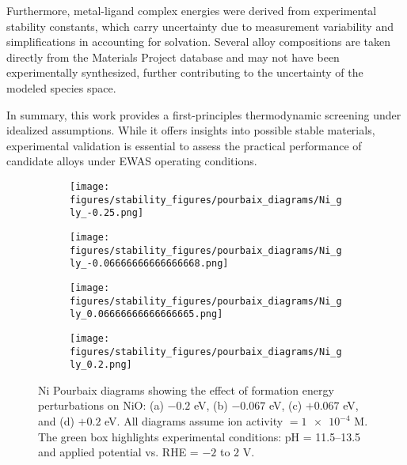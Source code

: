 \documentclass[journal=jacsat,manuscript=article]{achemso}
\begin{document}
Furthermore, metal-ligand complex energies were derived from experimental stability constants, which carry uncertainty due to measurement variability and simplifications in accounting for solvation. Several alloy compositions are taken directly from the Materials Project database and may not have been experimentally synthesized, further contributing to the uncertainty of the modeled species space.

In summary, this work provides a first-principles thermodynamic screening under idealized assumptions. While it offers insights into possible stable materials, experimental validation is essential to assess the practical performance of candidate alloys under EWAS operating conditions.


\begin{figure}[htbp]
    \centering
    \begin{subfigure}[b]{0.45\textwidth}
        \subcaption{}\label{fig:Ni_noise_-0.2}
        \texttt{[image: figures/stability\_figures/pourbaix\_diagrams/Ni\_gly\_-0.25.png]}
    \end{subfigure}
    \begin{subfigure}[b]{0.45\textwidth}
        \subcaption{}\label{fig:Ni_noise_-0.067}
        \texttt{[image: figures/stability\_figures/pourbaix\_diagrams/Ni\_gly\_-0.06666666666666668.png]} 
    \end{subfigure}
    \begin{subfigure}[b]{0.45\textwidth}
        \subcaption{}\label{fig:Ni_noise_0.067}
        \texttt{[image: figures/stability\_figures/pourbaix\_diagrams/Ni\_gly\_0.06666666666666665.png]} 
    \end{subfigure}
    \begin{subfigure}[b]{0.45\textwidth}
        \subcaption{}\label{fig:Ni_noise_0.2}
        \texttt{[image: figures/stability\_figures/pourbaix\_diagrams/Ni\_gly\_0.2.png]} 
    \end{subfigure}
    
    \caption{Ni Pourbaix diagrams showing the effect of formation energy perturbations on NiO: (a) $-0.2$ eV, (b) $-0.067$ eV, (c) $+0.067$ eV, and (d) $+0.2$ eV. All diagrams assume ion activity $= \num{1e-4}$ M. The green box highlights experimental conditions: pH = 11.5–13.5 and applied potential vs. RHE = $-2$ to $2$ V.}
    \label{fig:Ni_Pourbaix_noise}
\end{figure}
\end{document}
